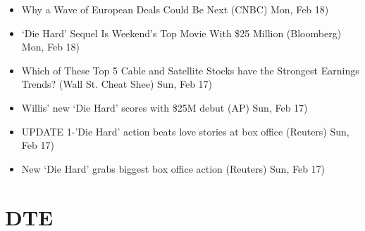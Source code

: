 \documentclass[11pt,asymmetric]{article}
\begin{document}
\begin{itemize}
\item Why a Wave of European Deals Could Be Next (CNBC) Mon, Feb 18)
\item ‘Die Hard’ Sequel Is Weekend’s Top Movie With \$25 Million (Bloomberg) Mon, Feb 18)
\item Which of These Top 5 Cable and Satellite Stocks have the Strongest Earnings Trends? (Wall St. Cheat Shee) Sun, Feb 17)
\item Willis' new `Die Hard' scores with \$25M debut (AP) Sun, Feb 17)
\item UPDATE 1-'Die Hard' action beats love stories at box office (Reuters) Sun, Feb 17)
\item New `Die Hard' grabs biggest box office action (Reuters) Sun, Feb 17)
\end{itemize}

\section*{DTE}
\end{document}
